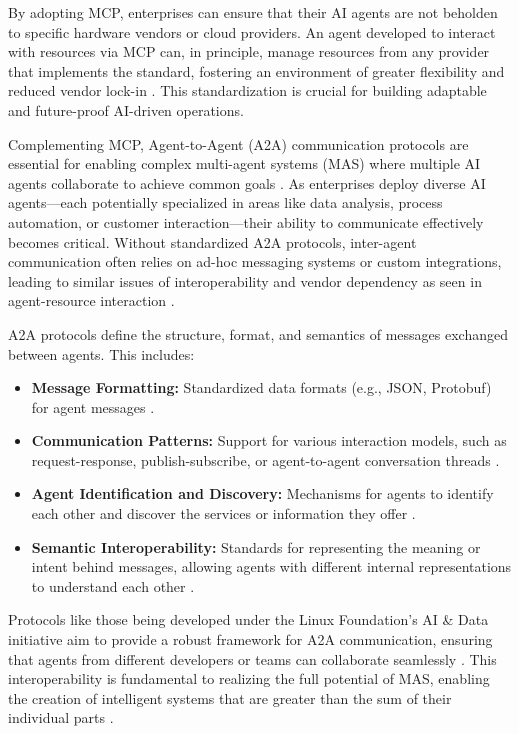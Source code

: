 By adopting MCP, enterprises can ensure that their AI agents are not beholden to specific hardware vendors or cloud providers. An agent developed to interact with resources via MCP can, in principle, manage resources from any provider that implements the standard, fostering an environment of greater flexibility and reduced vendor lock-in \cite{Reger2026, MCPspec}. This standardization is crucial for building adaptable and future-proof AI-driven operations.

Complementing MCP, Agent-to-Agent (A2A) communication protocols are essential for enabling complex multi-agent systems (MAS) where multiple AI agents collaborate to achieve common goals \cite{LinuxFoundationA2A}. As enterprises deploy diverse AI agents—each potentially specialized in areas like data analysis, process automation, or customer interaction—their ability to communicate effectively becomes critical. Without standardized A2A protocols, inter-agent communication often relies on ad-hoc messaging systems or custom integrations, leading to similar issues of interoperability and vendor dependency as seen in agent-resource interaction \cite{Reger2026}.

A2A protocols define the structure, format, and semantics of messages exchanged between agents. This includes:

\begin{itemize}
  \item \textbf{Message Formatting:} Standardized data formats (e.g., JSON, Protobuf) for agent messages \cite{LinuxFoundationA2A}.
  \item \textbf{Communication Patterns:} Support for various interaction models, such as request-response, publish-subscribe, or agent-to-agent conversation threads \cite{LinuxFoundationA2A}.
  \item \textbf{Agent Identification and Discovery:} Mechanisms for agents to identify each other and discover the services or information they offer \cite{Reger2026}.
  \item \textbf{Semantic Interoperability:} Standards for representing the meaning or intent behind messages, allowing agents with different internal representations to understand each other \cite{LinuxFoundationA2A}.
\end{itemize}

Protocols like those being developed under the Linux Foundation's AI \& Data initiative aim to provide a robust framework for A2A communication, ensuring that agents from different developers or teams can collaborate seamlessly \cite{LinuxFoundationA2A}. This interoperability is fundamental to realizing the full potential of MAS, enabling the creation of intelligent systems that are greater than the sum of their individual parts \cite{Reger2026}.

